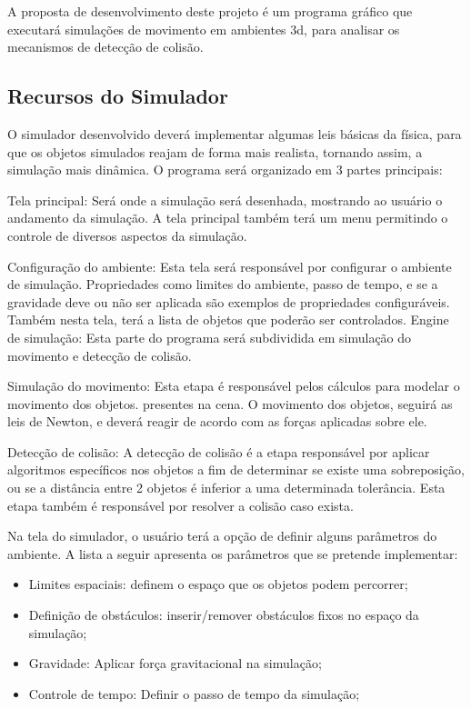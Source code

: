 A  proposta de desenvolvimento deste projeto é um programa gráfico que
executará simulações de movimento em ambientes 3d, para analisar os mecanismos de detecção de colisão.

\subsection{Recursos do Simulador}
O simulador desenvolvido deverá implementar algumas leis básicas da física, para que os objetos simulados reajam de forma mais realista, tornando assim, a simulação mais dinâmica. O programa será organizado em 3 partes principais:

Tela principal: Será onde a simulação será desenhada, mostrando ao usuário o andamento da simulação. A tela principal também terá um menu permitindo o controle de diversos aspectos da simulação. 

Configuração do ambiente: Esta tela será responsável por configurar o ambiente de simulação. Propriedades como limites do ambiente, passo de tempo, e se a gravidade deve ou não ser aplicada são exemplos de propriedades configuráveis. Também nesta tela, terá a lista de objetos que poderão ser controlados.
Engine de simulação: Esta parte do programa será subdividida em simulação do movimento e detecção de colisão. 

Simulação do movimento: Esta etapa é responsável pelos cálculos para modelar o movimento dos objetos. presentes na cena.
O movimento dos objetos, seguirá as leis de Newton, e  deverá reagir de acordo com as forças aplicadas sobre ele.

Detecção de colisão: A detecção de colisão é a etapa responsável por aplicar algoritmos específicos nos objetos a fim de determinar se existe uma sobreposição, ou se a distância entre 2 objetos é inferior a uma determinada tolerância. Esta etapa também é responsável por resolver a colisão caso exista. 

Na tela do simulador, o usuário terá a opção de definir alguns parâmetros do ambiente. A lista a seguir apresenta os parâmetros que se pretende implementar:
\begin{itemize}
  \item Limites espaciais: definem o espaço que os objetos podem percorrer;
  \item Definição de obstáculos: inserir/remover obstáculos fixos no espaço da simulação;
  \item Gravidade: Aplicar força gravitacional na simulação;
  \item Controle de tempo: Definir o passo de tempo da simulação;   
\end{itemize}
 
